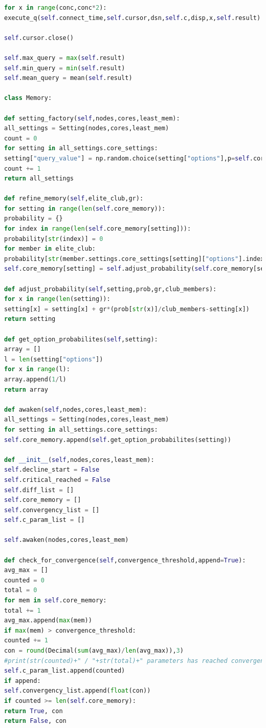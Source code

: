 \documentclass[a4paper,english]{report}
\begin{document}
\begin{lstlisting}[language=Python, caption=class\_definition.py\, the file defining all the algorithmic operations done during a optimization process.]
for x in range(conc,conc*2):
execute_q(self.connect_time,self.cursor,dsn,self.c,disp,x,self.result)

self.cursor.close()

self.max_query = max(self.result)
self.min_query = min(self.result)
self.mean_query = mean(self.result)

class Memory:

def setting_factory(self,nodes,cores,least_mem):
all_settings = Setting(nodes,cores,least_mem)
count = 0
for setting in all_settings.core_settings:
setting["query_value"] = np.random.choice(setting["options"],p=self.core_memory[count])
count += 1
return all_settings

def refine_memory(self,elite_club,gr):
for setting in range(len(self.core_memory)):
probability = {}
for index in range(len(self.core_memory[setting])):
probability[str(index)] = 0
for member in elite_club:
probability[str(member.settings.core_settings[setting]["options"].index(member.settings.core_settings[setting]["query_value"]))] += 1
self.core_memory[setting] = self.adjust_probability(self.core_memory[setting],probability,gr,len(elite_club))

def adjust_probability(self,setting,prob,gr,club_members):
for x in range(len(setting)):
setting[x] = setting[x] + gr*(prob[str(x)]/club_members-setting[x])
return setting

def get_option_probabilites(self,setting):
array = []
l = len(setting["options"])
for x in range(l):
array.append(1/l)
return array

def awaken(self,nodes,cores,least_mem):
all_settings = Setting(nodes,cores,least_mem)
for setting in all_settings.core_settings:
self.core_memory.append(self.get_option_probabilites(setting))

def __init__(self,nodes,cores,least_mem):
self.decline_start = False
self.critical_reached = False
self.diff_list = []
self.core_memory = []
self.convergency_list = []
self.c_param_list = []

self.awaken(nodes,cores,least_mem)

def check_for_convergence(self,convergence_threshold,append=True):
avg_max = []
counted = 0
total = 0
for mem in self.core_memory:
total += 1
avg_max.append(max(mem))
if max(mem) > convergence_threshold:
counted += 1
con = round(Decimal(sum(avg_max)/len(avg_max)),3)
#print(str(counted)+" / "+str(total)+" parameters has reached convergence") # Will never print because of os.system("clear") in estimate_time()
self.c_param_list.append(counted)
if append:
self.convergency_list.append(float(con))
if counted >= len(self.core_memory):
return True, con
return False, con


\end{lstlisting}
\end{document}
